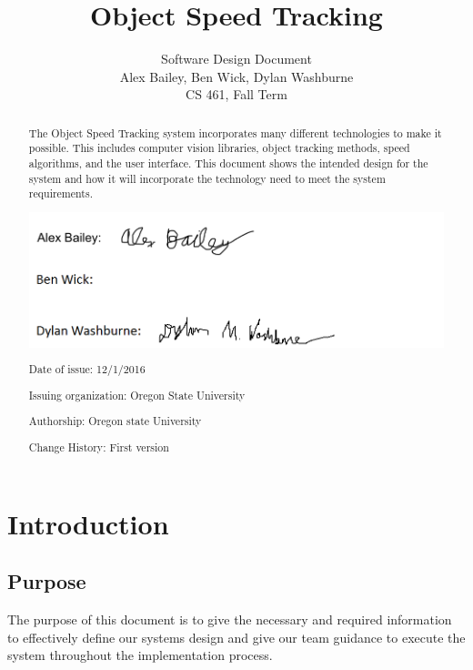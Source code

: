 \documentclass[letterpaper,10pt,onecolumn,draftclsnofoot]{IEEEtran}
\title{Object Speed Tracking}
\author{Software Design Document\\Alex Bailey, Ben Wick, Dylan Washburne\\CS 461, Fall Term}
\begin{document}
\begin{titlepage}

\maketitle

\begin{abstract}
The Object Speed Tracking system incorporates many different technologies to make it possible.
This includes computer vision libraries, object tracking methods, speed algorithms, and the user interface.
This document shows the intended design for the system and how it will incorporate the technology need to meet the system requirements.

\vspace*{\fill}

\includegraphics[scale=.6]{sigs}

Date of issue: 12/1/2016

Issuing organization: Oregon State University 

Authorship: Oregon state University 

Change History: First version 


 
\end{abstract}

\end{titlepage}

\tableofcontents
\newpage


\section{Introduction}
\subsection{Purpose}
The purpose of this document is to give the necessary and required information to effectively define our systems design and give our team guidance to execute the system throughout the implementation process.
\end{document}

